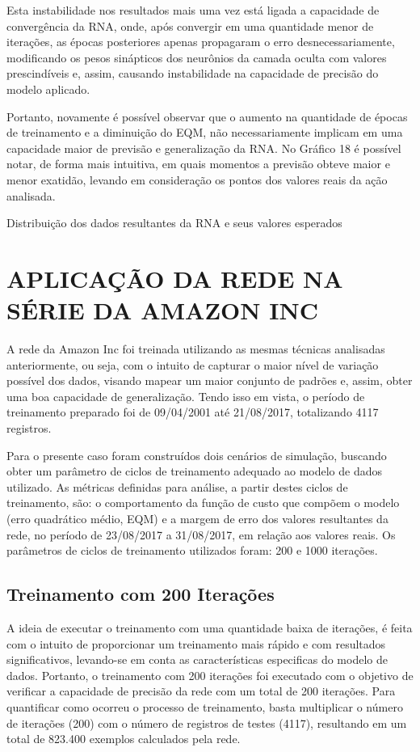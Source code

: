 Esta instabilidade nos resultados mais uma vez está ligada a capacidade de convergência da RNA, onde, após convergir em uma quantidade menor de iterações, as épocas posteriores apenas propagaram o erro desnecessariamente, modificando os pesos sinápticos dos neurônios da camada oculta com valores prescindíveis e, assim, causando instabilidade na capacidade de precisão do modelo aplicado. 

Portanto, novamente é possível observar que o aumento na quantidade de épocas de treinamento e a diminuição do EQM, não necessariamente implicam em uma capacidade maior de previsão e generalização da RNA. No Gráfico 18 é possível notar, de forma mais intuitiva, em quais momentos a previsão obteve maior e menor exatidão, levando em consideração os pontos dos valores reais da ação analisada.
\begin{grafico}[h]
	\centering
	\caption{Distribuição dos dados resultantes da RNA e seus valores esperados}
	\label{lingua}
\end{grafico}

\section{APLICAÇÃO DA REDE NA SÉRIE DA AMAZON INC}
A rede da Amazon Inc foi treinada utilizando as mesmas técnicas analisadas anteriormente, ou seja, com o intuito de capturar o maior nível de variação possível dos dados, visando mapear um maior conjunto de padrões e, assim, obter uma boa capacidade de generalização. Tendo isso em vista, o período de treinamento preparado foi de 09/04/2001 até 21/08/2017, totalizando 4117 registros.

Para o presente caso foram construídos dois cenários de simulação, buscando obter um parâmetro de ciclos de treinamento adequado ao modelo de dados utilizado. As métricas definidas para análise, a partir destes ciclos de treinamento, são: o comportamento da função de custo que compõem o modelo (erro quadrático médio, EQM) e a margem de erro dos valores resultantes da rede, no período de 23/08/2017 a 31/08/2017, em relação aos valores reais. Os parâmetros de ciclos de treinamento utilizados foram: 200 e 1000 iterações.

\subsection{Treinamento com 200 Iterações}	
A ideia de executar o treinamento com uma quantidade baixa de iterações, é feita com o intuito de proporcionar um treinamento mais rápido e com resultados significativos, levando-se em conta as características especificas do modelo de dados. Portanto, o treinamento com 200 iterações foi executado com o objetivo de verificar a capacidade de precisão da rede com um total de 200 iterações. Para quantificar como ocorreu o processo de treinamento, basta multiplicar o número de iterações (200) com o número de registros de testes (4117), resultando em um total de 823.400 exemplos calculados pela rede.

